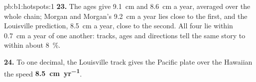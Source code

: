 \begin{solution}{pb:b1:hotspots:1}
\textbf{23.} The ages give \qty{9.1}{cm} and \qty{8.6}{cm} a year, averaged
over the whole chain; Morgan and Morgan's \qty{9.2}{cm} a year lies close to
the first, and the Louisville prediction, \qty{8.5}{cm} a year, close to the
second. All four lie within \qty{0.7}{cm} a year of one another: tracks, ages
and directions tell the same story to within about \qty{8}{\percent}.

\textbf{24.} To one decimal, the Louisville track gives the Pacific plate over
the Hawaiian  the speed
\textbf{\qty[text-series-to-math=true]{8.5}{cm.yr^{-1}}}.
\end{solution}
